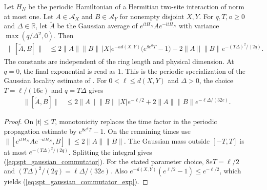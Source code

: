 \begin{lemma}
    \label{lem:spt_finite_ring_gaussian_commutator}
    \leanok
    Let $H_N$ be the periodic Hamiltonian of a Hermitian two-site interaction
    of norm at most one. Let $A\in\mathcal A_X$ and $B\in\mathcal A_Y$ for
    nonempty disjoint $X,Y$. For $q,T,a\geq0$ and $\Delta\in\mathbb R$, let
    $\widetilde A$ be the Gaussian average of $e^{itH_N}Ae^{-itH_N}$ with
    variance $\max(q/\Delta^2,0)$. Then
    \begin{align}
        \|[\widetilde A,B]\|
         & \leq 2\|A\|\|B\|\,|X|e^{-a d(X,Y)}
        \bigl(e^{8e^aT}-1\bigr)
        +2\|A\|\|B\|e^{-(T\Delta)^2/(2q)}.
        \label{eq:spt_gaussian_commutator}
    \end{align}
    The constants are independent of the ring length and physical dimension.
    At $q=0$, the final exponential is read as $1$.
    This is the periodic specialization of the Gaussian locality estimate
    of \cite[equation \texttt{lbnd}]{Hastings2006Solving}.
    For $0<\ell\leq d(X,Y)$ and $\Delta>0$, the choice
    $T=\ell/(16e)$ and $q=T\Delta$ gives
    \begin{align}
        \|[\widetilde A,B]\|
         & \leq 2\|A\|\|B\|\,|X|e^{-\ell/2}
        +2\|A\|\|B\|e^{-\ell\Delta/(32e)}.
        \label{eq:spt_gaussian_commutator_exp}
    \end{align}
\end{lemma}
\begin{proof}\leanok
    On $|t|\leq T$, monotonicity replaces the time factor in the periodic
    propagation estimate by $e^{8e^aT}-1$. On the remaining times use
    $\|[e^{itH_N}Ae^{-itH_N},B]\|\leq2\|A\|\|B\|$.
    The Gaussian mass outside $[-T,T]$ is at most
    $e^{-(T\Delta)^2/(2q)}$. Splitting the integral gives
    (\ref{eq:spt_gaussian_commutator}).
    For the stated parameter choice, $8eT=\ell/2$ and
    $(T\Delta)^2/(2q)=\ell\Delta/(32e)$. Also
    $e^{-d(X,Y)}(e^{\ell/2}-1)\leq e^{-\ell/2}$, which yields
    (\ref{eq:spt_gaussian_commutator_exp}).
\end{proof}


